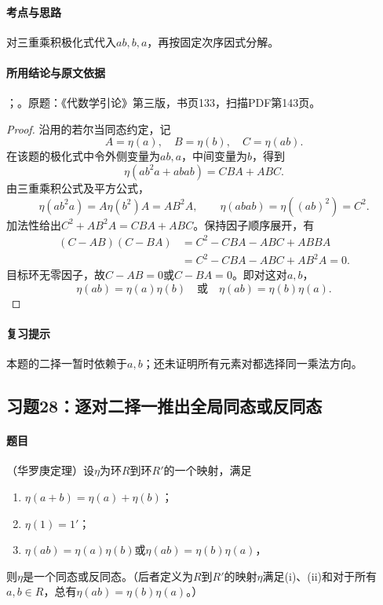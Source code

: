 \paragraph{考点与思路}

对三重乘积极化式代入$ab,b,a$，再按固定次序因式分解。

\paragraph{所用结论与原文依据}

；。原题：《代数学引论》第三版，书页133，扫描PDF第143页。


\begin{proof}

沿用的若尔当同态约定，记
\[
A=\eta(a),\quad B=\eta(b),\quad C=\eta(ab).
\]
在该题的极化式中令外侧变量为$ab,a$，中间变量为$b$，得到
\[
\eta(ab^2a+abab)=CBA+ABC.
\]
由三重乘积公式及平方公式，
\[
\eta(ab^2a)=A\eta(b^2)A=AB^2A,\qquad
\eta(abab)=\eta((ab)^2)=C^2.
\]
加法性给出$C^2+AB^2A=CBA+ABC$。保持因子顺序展开，有
\begin{align*}
(C-AB)(C-BA)
&=C^2-CBA-ABC+ABBA\\
&=C^2-CBA-ABC+AB^2A=0.
\end{align*}
目标环无零因子，故$C-AB=0$或$C-BA=0$。即对这对$a,b$，
\[
\eta(ab)=\eta(a)\eta(b)\quad\text{或}\quad\eta(ab)=\eta(b)\eta(a).
\]

\end{proof}

\paragraph{复习提示}

本题的二择一暂时依赖于$a,b$；还未证明所有元素对都选择同一乘法方向。



\subsection{习题28：逐对二择一推出全局同态或反同态}

\label{ex:3:28}

\paragraph{题目}

（华罗庚定理）设$\eta$为环$R$到环$R'$的一个映射，满足
\begin{enumerate}[label=(\roman*)]
\item $\eta(a+b)=\eta(a)+\eta(b)$；
\item $\eta(1)=1'$；
\item $\eta(ab)=\eta(a)\eta(b)$或$\eta(ab)=\eta(b)\eta(a)$，
\end{enumerate}
则$\eta$是一个同态或反同态。（后者定义为$R$到$R'$的映射$\eta$满足(i)、(ii)和对于所有$a,b\in R$，总有$\eta(ab)=\eta(b)\eta(a)$。）

